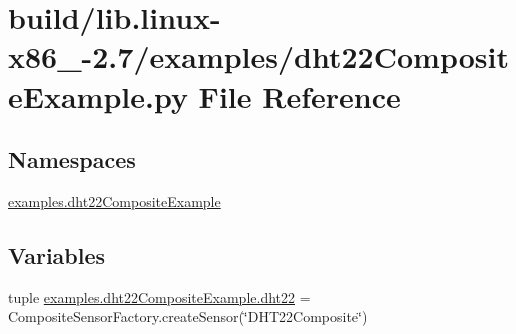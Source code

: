 \hypertarget{build_2lib_8linux-x86__64-2_87_2examples_2dht22CompositeExample_8py}{}\section{build/lib.linux-\/x86\+\_-\/2.7/examples/dht22\+Composite\+Example.py File Reference}
\label{build_2lib_8linux-x86__64-2_87_2examples_2dht22CompositeExample_8py}
\subsection*{Namespaces}
\begin{DoxyCompactItemize}
\item 
 \hyperlink{namespaceexamples_1_1dht22CompositeExample}{examples.\+dht22\+Composite\+Example}
\end{DoxyCompactItemize}
\subsection*{Variables}
\begin{DoxyCompactItemize}
\item 
tuple \hyperlink{namespaceexamples_1_1dht22CompositeExample_a1c6e3a4c9e037e30d50b361ed4dd926f}{examples.\+dht22\+Composite\+Example.\+dht22} = Composite\+Sensor\+Factory.\+create\+Sensor(\char`\"{}D\+H\+T22\+Composite\char`\"{})
\end{DoxyCompactItemize}
